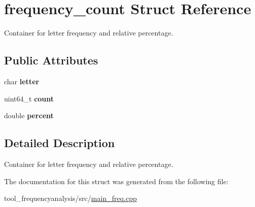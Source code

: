 \hypertarget{structfrequency__count}{}\section{frequency\+\_\+count Struct Reference}
\label{structfrequency__count}


Container for letter frequency and relative percentage.  


\subsection*{Public Attributes}
\begin{DoxyCompactItemize}
\item 
char {\bfseries letter}\hypertarget{structfrequency__count_ac5b381836a5b5195100201e47ca9f1d6}{}\label{structfrequency__count_ac5b381836a5b5195100201e47ca9f1d6}

\item 
uint64\+\_\+t {\bfseries count}\hypertarget{structfrequency__count_aaff3dad04e274c0b4be9ef53941ad572}{}\label{structfrequency__count_aaff3dad04e274c0b4be9ef53941ad572}

\item 
double {\bfseries percent}\hypertarget{structfrequency__count_a808aeb2a82ac6ba9c8613c00d9000cff}{}\label{structfrequency__count_a808aeb2a82ac6ba9c8613c00d9000cff}

\end{DoxyCompactItemize}


\subsection{Detailed Description}
Container for letter frequency and relative percentage. 

The documentation for this struct was generated from the following file\+:\begin{DoxyCompactItemize}
\item 
tool\+\_\+frequencyanalysis/src/\hyperlink{main__freq_8cpp}{main\+\_\+freq.\+cpp}\end{DoxyCompactItemize}

